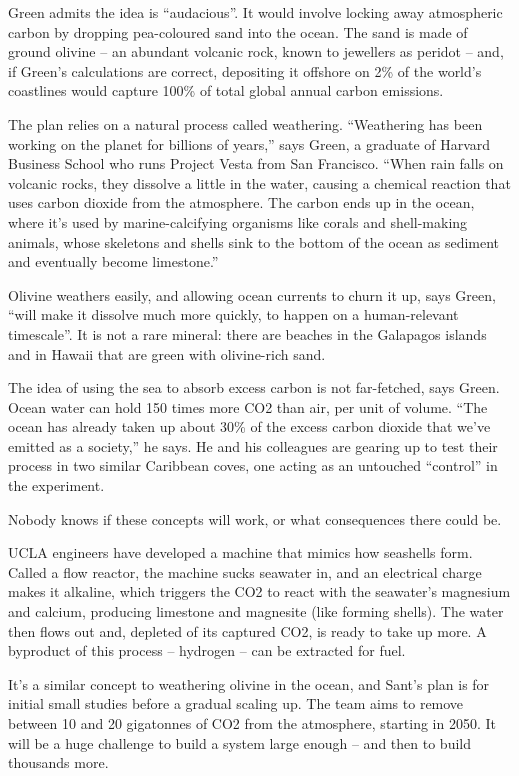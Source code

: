 \documentclass[
]{book}
\begin{document}
Green admits the idea is ``audacious''. It would involve locking away atmospheric carbon by dropping pea-coloured sand into the ocean. The sand is made of ground olivine -- an abundant volcanic rock, known to jewellers as peridot -- and, if Green's calculations are correct, depositing it offshore on 2\% of the world's coastlines would capture 100\% of total global annual carbon emissions.

The plan relies on a natural process called weathering. ``Weathering has been working on the planet for billions of years,'' says Green, a graduate of Harvard Business School who runs Project Vesta from San Francisco. ``When rain falls on volcanic rocks, they dissolve a little in the water, causing a chemical reaction that uses carbon dioxide from the atmosphere. The carbon ends up in the ocean, where it's used by marine-calcifying organisms like corals and shell-making animals, whose skeletons and shells sink to the bottom of the ocean as sediment and eventually become limestone.''

Olivine weathers easily, and allowing ocean currents to churn it up, says Green, ``will make it dissolve much more quickly, to happen on a human-relevant timescale''. It is not a rare mineral: there are beaches in the Galapagos islands and in Hawaii that are green with olivine-rich sand.

The idea of using the sea to absorb excess carbon is not far-fetched, says Green. Ocean water can hold 150 times more CO2 than air, per unit of volume. ``The ocean has already taken up about 30\% of the excess carbon dioxide that we've emitted as a society,'' he says. He and his colleagues are gearing up to test their process in two similar Caribbean coves, one acting as an untouched ``control'' in the experiment.

Nobody knows if these concepts will work, or what consequences there could be.

UCLA engineers have developed a machine that mimics how seashells form. Called a flow reactor, the machine sucks seawater in, and an electrical charge makes it alkaline, which triggers the CO2 to react with the seawater's magnesium and calcium, producing limestone and magnesite (like forming shells). The water then flows out and, depleted of its captured CO2, is ready to take up more. A byproduct of this process -- hydrogen -- can be extracted for fuel.

It's a similar concept to weathering olivine in the ocean, and Sant's plan is for initial small studies before a gradual scaling up. The team aims to remove between 10 and 20 gigatonnes of CO2 from the atmosphere, starting in 2050.
It will be a huge challenge to build a system large enough -- and then to build thousands more.
\end{document}
